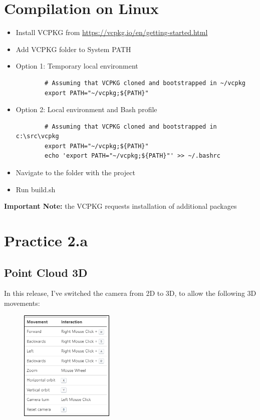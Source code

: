 \documentclass[12pt,a4paper,english]{article}
\begin{document}
\section{Compilation on Linux}

\begin{itemize}
    \item Install VCPKG from \url{https://vcpkg.io/en/getting-started.html}
    \item Add VCPKG folder to System PATH
    \item Option 1: Temporary local environment
    \begin{verbatim}
        # Assuming that VCPKG cloned and bootstrapped in ~/vcpkg
        export PATH="~/vcpkg;${PATH}"
    \end{verbatim}

    \item Option 2: Local environment and Bash profile
    \begin{verbatim}
        # Assuming that VCPKG cloned and bootstrapped in c:\src\vcpkg
        export PATH="~/vcpkg;${PATH}"
        echo 'export PATH="~/vcpkg;${PATH}"' >> ~/.bashrc
    \end{verbatim}

    \item Navigate to the folder with the project
    \item Run build.sh
\end{itemize}
\textbf{Important Note:} the VCPKG requests installation of additional packages

\section{Practice 2.a}
\subsection{Point Cloud 3D}

In this release, I've switched the camera from 2D to 3D, to allow the following 3D movements:

\begin{figure}[H]
    \centering
    \includegraphics[width=0.4\textwidth]{movements}
    \captionsetup{labelformat=empty}
    \caption[]{}
    \label{fig:movements}
\end{figure}
\end{document}
